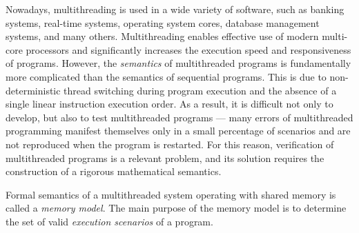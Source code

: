 
{\actuality} 
Nowadays, multithreading is used in a wide variety of software, such as banking systems, real-time systems, operating system cores, database management systems, and many others. Multithreading enables effective use of modern multi-core processors and significantly increases the execution speed and responsiveness of programs. However, the \emph{semantics} of multithreaded programs is fundamentally more complicated than the semantics of sequential programs. This is due to non-deterministic thread switching during program execution and the absence of a single linear instruction execution order. As a result, it is difficult not only to develop, but also to test multithreaded programs  --- many errors of multithreaded programming manifest themselves only in a small percentage of scenarios and are not reproduced when the program is restarted. For this reason, verification of multithreaded programs is a relevant problem, and its solution requires the construction of a rigorous mathematical semantics.

Formal semantics of a multithreaded system operating with shared memory is called a \emph{memory model}.
The main purpose of the memory model is to determine the set of valid \emph{execution scenarios} of a program.

